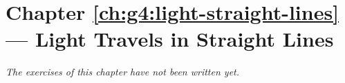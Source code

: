 \section*{Chapter \ref{ch:g4:light-straight-lines} --- Light Travels in Straight Lines}


\emph{The exercises of this chapter have not been written yet.}

